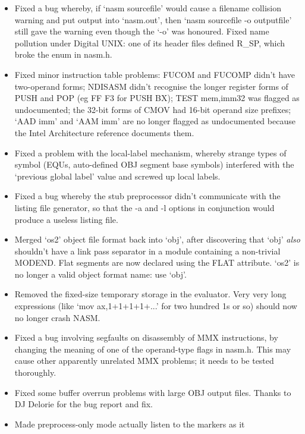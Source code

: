 \begin{itemize}
    \item{Fixed a bug whereby, if `nasm sourcefile' would cause a filename
        collision warning and put output into `nasm.out', then `nasm
        sourcefile -o outputfile' still gave the warning even though the
        `-o' was honoured.
        Fixed name pollution under Digital UNIX: one of its header files
        defined R\_SP, which broke the enum in nasm.h.}
    \item{Fixed minor instruction table problems: FUCOM and FUCOMP didn't have
        two-operand forms; NDISASM didn't recognise the longer register
        forms of PUSH and POP (eg FF F3 for PUSH BX); TEST mem,imm32 was
        flagged as undocumented; the 32-bit forms of CMOV had 16-bit operand
        size prefixes; `AAD imm' and `AAM imm' are no longer flagged as
        undocumented because the Intel Architecture reference documents
        them.}
    \item{Fixed a problem with the local-label mechanism, whereby strange
        types of symbol (EQUs, auto-defined OBJ segment base symbols)
        interfered with the `previous global label' value and screwed up
        local labels.}
    \item{Fixed a bug whereby the stub preprocessor didn't communicate with
        the listing file generator, so that the -a and -l options in
        conjunction would produce a useless listing file.}
    \item{Merged `os2' object file format back into `obj', after discovering
        that `obj' \emph{also} shouldn't have a link pass separator in a module
        containing a non-trivial MODEND. Flat segments are now declared
        using the FLAT attribute. `os2' is no longer a valid object format
        name: use `obj'.}
    \item{Removed the fixed-size temporary storage in the evaluator. Very very
        long expressions (like `mov ax,1+1+1+1+...' for two hundred 1s or
        so) should now no longer crash NASM.}
    \item{Fixed a bug involving segfaults on disassembly of MMX instructions,
        by changing the meaning of one of the operand-type flags in nasm.h.
        This may cause other apparently unrelated MMX problems; it needs to
        be tested thoroughly.}
    \item{Fixed some buffer overrun problems with large OBJ output files.
        Thanks to DJ Delorie for the bug report and fix.}
    \item{Made preprocess-only mode actually listen to the  markers as it
}
\end{itemize}
